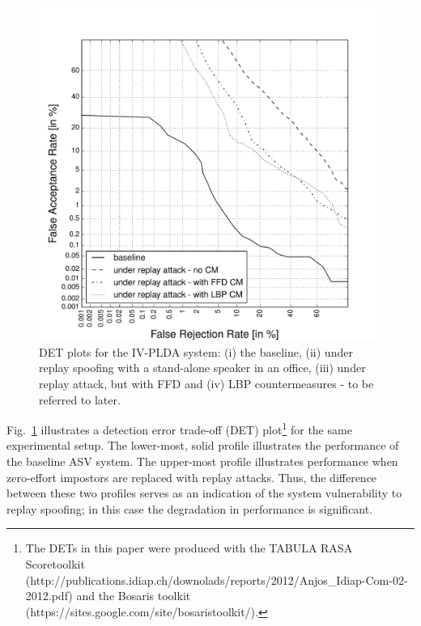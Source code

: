 \begin{figure}[!t]
	\centering
	\includegraphics[width=1\linewidth]{Figs/DET_IVPLDA_counter_Behr.pdf}
	\caption{DET plots for the IV-PLDA system: (i) the baseline, (ii) under replay spoofing with a stand-alone speaker in an office, (iii) under replay attack, but with FFD and (iv) LBP countermeasures - to be referred to later.}

	\label{fig::DETs_replay_IV}
\end{figure}


Fig.~\ref{fig::DETs_replay_IV} illustrates a detection error trade-off (DET) plot\footnote{The DETs in this paper were produced with the TABULA RASA Scoretoolkit (http://publications.idiap.ch/downolads/reports/2012/Anjos\_Idiap-Com-02-2012.pdf) and the Bosaris toolkit (https://sites.google.com/site/bosaristoolkit/).} for the same experimental setup.  The lower-most, solid profile illustrates the performance of the baseline ASV system.  The upper-most profile illustrates performance when zero-effort impostors are replaced with replay attacks.  Thus, the difference between these two profiles serves as an indication of the system vulnerability to replay spoofing; in this case the degradation in performance is significant.  


